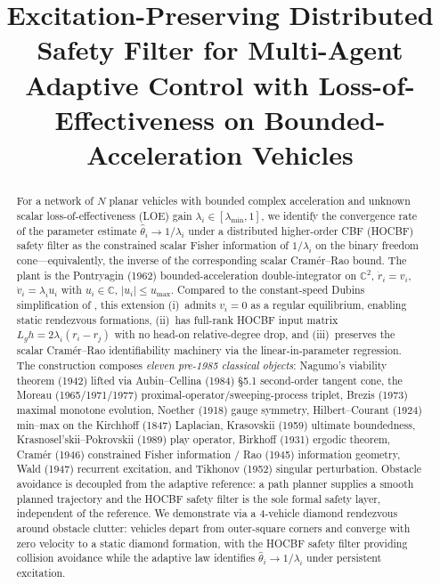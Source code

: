 \documentclass[letterpaper,10pt,conference]{IEEEtran}
\title{Excitation-Preserving Distributed Safety Filter for Multi-Agent\\
       Adaptive Control with Loss-of-Effectiveness on Bounded-Acceleration Vehicles}
\author{\IEEEauthorblockN{D. Maldonado-Naranjo}
\IEEEauthorblockA{(institutional affiliation TBD)}}
\newcommand{\thethat}{\hat\theta}
\begin{document}
\maketitle

\begin{abstract}
For a network of $N$ planar vehicles with bounded complex acceleration and unknown scalar loss-of-effectiveness (LOE) gain $\lambda_i \in [\lambda_{\min}, 1]$, we identify the convergence rate of the parameter estimate $\thethat_i \to 1/\lambda_i$ under a distributed higher-order CBF (HOCBF) safety filter as the constrained scalar Fisher information of $1/\lambda_i$ on the binary freedom cone---equivalently, the inverse of the corresponding scalar Cram\'er--Rao bound. The plant is the Pontryagin (1962) bounded-acceleration double-integrator on $\mathbb{C}^2$, $\dot r_i = v_i$, $\dot v_i = \lambda_i u_i$ with $u_i \in \mathbb{C}$, $|u_i| \le u_{\max}$. Compared to the constant-speed Dubins simplification of \cite{maldonadoAnnaswamy2025}, this extension (i)~admits $v_i = 0$ as a regular equilibrium, enabling static rendezvous formations, (ii)~has full-rank HOCBF input matrix $L_g h = 2\lambda_i(r_i - r_j)$ with no head-on relative-degree drop, and (iii)~preserves the scalar Cram\'er--Rao identifiability machinery via the linear-in-parameter regression. The construction composes \emph{eleven pre-1985 classical objects}: Nagumo's viability theorem (1942) lifted via Aubin--Cellina (1984) §5.1 second-order tangent cone, the Moreau (1965/1971/1977) proximal-operator/sweeping-process triplet, Brezis (1973) maximal monotone evolution, Noether (1918) gauge symmetry, Hilbert--Courant (1924) min--max on the Kirchhoff (1847) Laplacian, Krasovskii (1959) ultimate boundedness, Krasnosel'skii--Pokrovskii (1989) play operator, Birkhoff (1931) ergodic theorem, Cram\'er (1946) constrained Fisher information / Rao (1945) information geometry, Wald (1947) recurrent excitation, and Tikhonov (1952) singular perturbation. Obstacle avoidance is decoupled from the adaptive reference: a path planner supplies a smooth planned trajectory and the HOCBF safety filter is the sole formal safety layer, independent of the reference. We demonstrate via a 4-vehicle diamond rendezvous around obstacle clutter: vehicles depart from outer-square corners and converge with zero velocity to a static diamond formation, with the HOCBF safety filter providing collision avoidance while the adaptive law identifies $\thethat_i \to 1/\lambda_i$ under persistent excitation.
\end{abstract}
\end{document}
